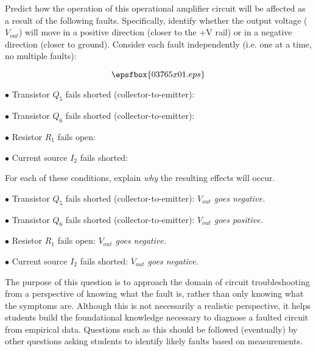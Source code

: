 

Predict how the operation of this operational amplifier circuit will be affected as a result of the following faults.  Specifically, identify whether the output voltage ($V_{out}$) will move in a positive direction (closer to the +V rail) or in a negative direction (closer to ground).  Consider each fault independently (i.e. one at a time, no multiple faults):

$$\epsfbox{03765x01.eps}$$

\medskip
\item{$\bullet$} Transistor $Q_5$ fails shorted (collector-to-emitter):
\vskip 5pt
\item{$\bullet$} Transistor $Q_6$ fails shorted (collector-to-emitter):
\vskip 5pt
\item{$\bullet$} Resistor $R_1$ fails open:
\vskip 5pt
\item{$\bullet$} Current source $I_2$ fails shorted:
\medskip

For each of these conditions, explain {\it why} the resulting effects will occur.







\medskip
\item{$\bullet$} Transistor $Q_5$ fails shorted (collector-to-emitter): {\it $V_{out}$ goes negative.}
\vskip 5pt
\item{$\bullet$} Transistor $Q_6$ fails shorted (collector-to-emitter): {\it $V_{out}$ goes positive.}
\vskip 5pt
\item{$\bullet$} Resistor $R_1$ fails open: {\it $V_{out}$ goes negative.}
\vskip 5pt
\item{$\bullet$} Current source $I_2$ fails shorted: {\it $V_{out}$ goes negative.}
\medskip







The purpose of this question is to approach the domain of circuit troubleshooting from a perspective of knowing what the fault is, rather than only knowing what the symptoms are.  Although this is not necessarily a realistic perspective, it helps students build the foundational knowledge necessary to diagnose a faulted circuit from empirical data.  Questions such as this should be followed (eventually) by other questions asking students to identify likely faults based on measurements.




